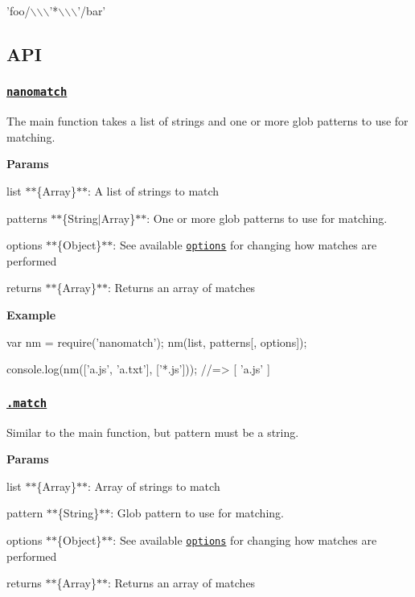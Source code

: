 \begin{DoxyCode}
'foo/\(\backslash\)\(\backslash\)\(\backslash\)'*\(\backslash\)\(\backslash\)\(\backslash\)'/bar'
\end{DoxyCode}


\subsection*{A\+PI}

\subsubsection*{\href{index.js#L40}{\tt nanomatch}}

The main function takes a list of strings and one or more glob patterns to use for matching.

{\bfseries Params}


\begin{DoxyItemize}
\item {\ttfamily list} $\ast$$\ast$\{Array\}$\ast$$\ast$\+: A list of strings to match
\item {\ttfamily patterns} $\ast$$\ast$\{String$\vert$\+Array\}$\ast$$\ast$\+: One or more glob patterns to use for matching.
\item {\ttfamily options} $\ast$$\ast$\{Object\}$\ast$$\ast$\+: See available \href{#options}{\tt options} for changing how matches are performed
\item {\ttfamily returns} $\ast$$\ast$\{Array\}$\ast$$\ast$\+: Returns an array of matches
\end{DoxyItemize}

{\bfseries Example}


\begin{DoxyCode}
var nm = require('nanomatch');
nm(list, patterns[, options]);

console.log(nm(['a.js', 'a.txt'], ['*.js']));
//=> [ 'a.js' ]
\end{DoxyCode}


\subsubsection*{\href{index.js#L106}{\tt .match}}

Similar to the main function, but {\ttfamily pattern} must be a string.

{\bfseries Params}


\begin{DoxyItemize}
\item {\ttfamily list} $\ast$$\ast$\{Array\}$\ast$$\ast$\+: Array of strings to match
\item {\ttfamily pattern} $\ast$$\ast$\{String\}$\ast$$\ast$\+: Glob pattern to use for matching.
\item {\ttfamily options} $\ast$$\ast$\{Object\}$\ast$$\ast$\+: See available \href{#options}{\tt options} for changing how matches are performed
\item {\ttfamily returns} $\ast$$\ast$\{Array\}$\ast$$\ast$\+: Returns an array of matches
\end{DoxyItemize}

